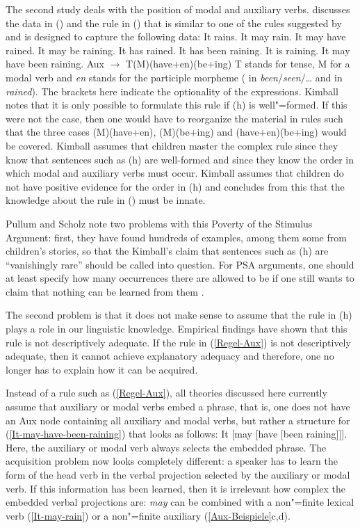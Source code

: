The second study deals with the position of modal and auxiliary verbs. \citet[--75]{Kimball73b-u} discusses the data in () and the rule in () that is similar to one of the rules suggested by
 \citet[]{Chomsky57a} and is designed to capture the following data: 
\eal
\label{Aux-Beispiele}
\ex It rains.
\ex\label{It-may-rain} 
It may rain.
\ex It may have rained.
\ex It may be raining.
\ex It has rained.
\ex It has been raining.
\ex It is raining.
\ex\label{It-may-have-been-raining}
It may have been raining.
\zl
\ea
\label{Regel-Aux}
Aux $\to$ T(M)(have+en)(be+ing)
\z
T stands for tense, M for a modal verb and \emph{en} stands for the participle morpheme ( in
\emph{been}/\emph{seen}/\ldots{} and  in \emph{rained}). The brackets here indicate the optionality
of the expressions. Kimball notes that it is only possible to formulate this rule if (h) is well"=formed.
If this were not the case, then one would have to reorganize the material in rules such that the three cases
(M)(have+en), (M)(be+ing) and (have+en)(be+ing) would be covered.
Kimball assumes that children master the complex rule since they know that sentences such as
(h) are well-formed and since
they know the order in which modal and auxiliary verbs must occur. Kimball assumes that children do not have positive
evidence for the order in (h) and concludes from this that the knowledge about the rule in () must
be innate.

Pullum and Scholz note two problems with this Poverty of the Stimulus Argument: first, they have found hundreds of examples, among them some from
children's stories, so that the Kimball's claim that sentences such as (h) are ``vanishingly rare'' should
be called into question. For PSA arguments, one should at least specify how many occurrences there are allowed to be if one still wants to claim
that nothing can be learned from them \citep[]{PS2002a}. 

The second problem is that it does not make sense to assume that the rule in  (h) plays a role in our linguistic knowledge.
Empirical findings have shown that this rule is not descriptively adequate. If the rule in (\ref{Regel-Aux}) is not descriptively
adequate, then it cannot achieve explanatory adequacy and therefore, one no longer has to explain how it can be acquired.
  
Instead of a rule such as (\ref{Regel-Aux}), all theories discussed here currently assume that auxiliary or modal verbs embed a phrase, that is,
one does not have an Aux node containing all auxiliary and modal verbs, but rather a structure for (\ref{It-may-have-been-raining}) that looks
as follows:
\ea
It [may [have [been raining]]].
\z
Here, the auxiliary or modal verb always selects the embedded phrase. The acquisition problem now looks completely different: a speaker has to learn the form
of the head verb in the verbal projection selected by the auxiliary or modal verb. If this information has been learned, then it is irrelevant
how complex the embedded verbal projections are: \emph{may} can be combined with a non"=finite lexical verb (\ref{It-may-rain}) or a non"=finite
auxiliary (\ref{Aux-Beispiele}c,d).


